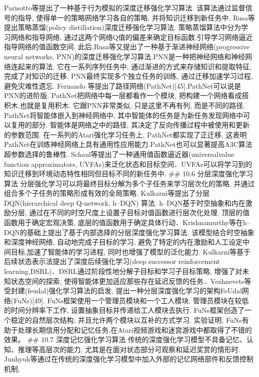 Parisotto等提出了一种基于行为模拟的深度迁移强化学习算法.
该算法通过监督信号的指导, 使得单一的策略网络学习各自的策略,
并将知识迁移到新任务中. Rusa等提出策略蒸馏(policy
distillation)深度迁移强化学习算法. 策略蒸馏算法中分为学习网络和指导网络,
通过这两个网络Q值的偏差来确定目标函数,引导学习网络逼近指导网络的值函数空间.
此后,Rusa等又提出了一种基于渐进神经网络(progressive neural networks,
PNN)的深度迁移强化学习算法.PNN是一种把神经网络和神经网络连起来的算法.
它在一系列序列任务中, 通过渐进的方式来存储知识和提取特征,
完成了对知识的迁移. PNN最终实现多个独立任务的训练, 通过迁移加速学习过程,
避免灾难性遗忘. Fernando
等提出了路径网络(PathNet){[}45{]}.PathNet可以说是PNN的进阶版.
PathNet把网络中每一层都看作一个模块,
把构建一个网络看成搭积木,也就是复用积木. 它跟PNN非常类似,
只是这里不再有列, 而是不同的路径. PathNet将智能体嵌入到神经网络中,
其中智能体的任务是为新任务发现网络中可以复用的部分.
智能体是网络之中的路径, 其决定了反向传播过程中被使用和更新的参数范围.
在一系列的Atari强化学习任务上, PathNet都实现了正迁移,
这表明PathNet在训练神经网络上具有通用性应用能力.PathNet也可以显著提高A3C算法超参数选择的鲁棒性.
Schaul等提出了一种通用值函数逼近器(universalvalue function
approximators,
UVFAs)来泛化状态和目标空间．UVFAs可以将学习到的知识迁移到环境动态特性相同但目标不同的新任务中.
\#\# 10.6 分层深度强化学习算法
分层强化学习可以将最终目标分解为多个子任务来学习层次化的策略,
并通过组合多个子任务的策略形成有效的全局策略.
Kulkarni等提出了分层DQN(hierarchical deep Q-network, h--DQN) 算法.
h--DQN基于时空抽象和内在激励分层,
通过在不同的时空尺度上设置子目标对值函数进行层次化处理.
顶层的值函数用于确定宏观决策,
底层的值函数用于确定具体行动．Krishnamurthy等在h--DQN的基础上提出了基于内部选择的分层深度强化学习算法.
该模型结合时空抽象和深度神经网络, 自动地完成子目标的学习,
避免了特定的内在激励和人工设定中间目标,加速了智能体的学习进程,
同时也增强了模型的泛化能力.
Kulkarni等基于后续状态表示法提出了深度后续强化学习(deep successor
reinforcement
learning,DSRL)．DSRL通过阶段性地分解子目标和学习子目标策略,
增强了对未知状态空间的探索,
使得智能体更加适应那些存在延迟反馈的任务．Vezhnevets等受封建(feudal)强化学习算法的启发,
提出一种分层深度强化学习的架构FeUdal网络(FuNs){[}49{]}.
FuNs框架使用一个管理员模块和一个工人模块.
管理员模块在较低的时间分辨率下工作, 设置抽象目标并传递给工人模块去执行.
FuNs框架创造了一个稳定的自然层次结构, 并且允许两个模块以互补的方式学习.
实验证明,
FuNs有助于处理长期信用分配和记忆任务,在Atari视频游戏和迷宫游戏中都取得了不错的效果。
\#\# 10.7 深度记忆强化学习算法
传统的深度强化学习模型不具备记忆、认知、推理等高层次的能力,
尤其是在面对状态部分可观察和延迟奖赏的情形时.
Junhyuk等通过在传统的深度强化学习模型中加入外部的记忆网络部件和反馈控制机制,
